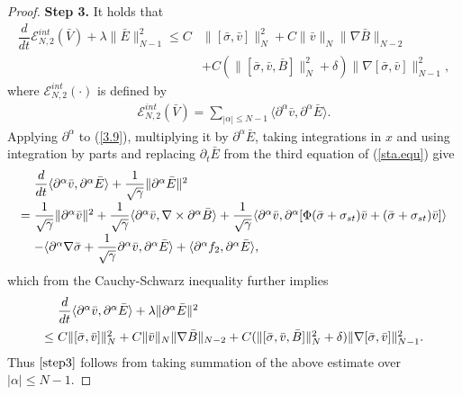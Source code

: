 \documentclass[11pt]{amsart}
\numberwithin{equation}{section}
\begin{document}
\begin{proof}
\textbf{Step 3.} It holds that
\begin{equation}\label{step3}
  \begin{aligned}
  \dfrac{d}{dt}\mathcal {E}_{N,2}^{int}(\bar{V})+\lambda\|\bar{E}\|^{2}_{N-1} \leq
  C&\|[\bar{\sigma},\bar{v}]\|_{N}^{2}+C\|\bar{v}\|_{N}\|\nabla
  \bar{B}\|_{N-2}\\
  &+C(\|[\bar{\sigma},\bar{v},\bar{B}]\|_{N}^{2}+\delta)
  \|\nabla[\bar{\sigma},\bar{v}]\|_{N-1}^{2},
  \end{aligned}
\end{equation}
where $\mathcal {E}_{N,2}^{int}(\cdot)$ is defined by
\begin{eqnarray*}
\mathcal {E}_{N,2}^{int}(\bar{V})=\sum_{|\alpha|\leq N-1}\langle
\partial^{\alpha}\bar{v},\partial^{\alpha}\bar{E}\rangle.
\end{eqnarray*}
Applying $\partial^{\alpha}$ to (\ref{3.9}), multiplying it by
$\partial^{\alpha}\bar{E}$, taking integrations in $x$ and using
integration by parts and replacing $ \partial_{t}\bar{E}$  from the
third equation of (\ref{sta.equ}) give
\begin{equation*}
\arraycolsep=1.5pt
\begin{array}{rl}
 &\dfrac{d}{dt}\langle
\partial^{\alpha}\bar{v},\partial^{\alpha}\bar{E}\rangle+
\dfrac{1}{\sqrt{\gamma}}\|\partial^{\alpha}\bar{E}\|^{2}\\[3mm]
=& \dfrac{1}{\sqrt{\gamma}}\|\partial^{\alpha}\bar{v}\|^{2}+
\dfrac{1}{\sqrt{\gamma}}\langle
\partial^{\alpha}\bar{v},\nabla \times \partial^{\alpha}\bar{B}\rangle+\dfrac{1}{\sqrt{\gamma}}\langle
\partial^{\alpha}\bar{v},
\partial^{\alpha}[\Phi(\bar{\sigma}+\sigma_{st})\bar{v}+(\bar{\sigma}+\sigma_{st})\bar{v}]\rangle\\[3mm]
&-\langle\partial^{\alpha}\nabla
\bar{\sigma}+\dfrac{1}{\sqrt{\gamma}}\partial^{\alpha}\bar{v},\partial^{\alpha}\bar{E}\rangle
+\langle\partial^{\alpha}f_{2},
\partial^{\alpha}\bar{E}\rangle,
\end{array}
\end{equation*}
which from the Cauchy-Schwarz inequality further implies
\begin{equation*}
\arraycolsep=1.5pt
\begin{array}{rl}
 &\dfrac{d}{dt}\langle
\partial^{\alpha}\bar{v},\partial^{\alpha}\bar{E}\rangle+
\lambda\|\partial^{\alpha}\bar{E}\|^{2}\\[3mm]
 \leq &
  C\|[\bar{\sigma},\bar{v}]\|_{N}^{2}+C\|\bar{v}\|_{N}\|\nabla
  \bar{B}\|_{N-2}+C(\|[\bar{\sigma},\bar{v},\bar{B}]\|_{N}^{2}+\delta)
  \|\nabla[\bar{\sigma},\bar{v}]\|_{N-1}^{2}.
\end{array}
\end{equation*}
Thus $\eqref{step3}$ follows from taking summation of the above
estimate over $|\alpha|\leq N-1$.


\end{proof}
\end{document}
